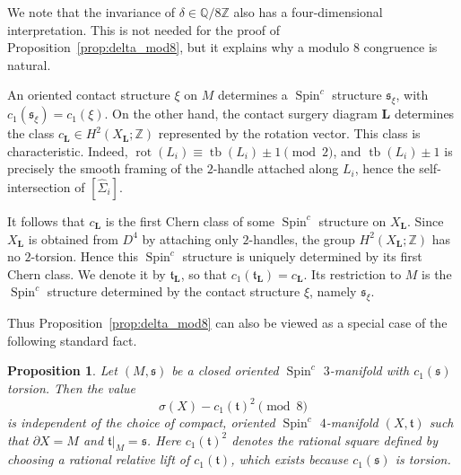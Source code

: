 \documentclass{amsart}
\numberwithin{equation}{section}
\numberwithin{figure}{section}
\newtheorem{proposition}[theorem]{Proposition}
\theoremstyle{definition}
\theoremstyle{remark}
\DeclareMathOperator{\tb}{tb}
\DeclareMathOperator{\rot}{rot}
\let\oldSigma\Sigma
\renewcommand{\Sigma}{\oldSigma}
\let\olddxi\xi %
\renewcommand{\xi}{\olddxi}
\begin{document}
We note that the invariance of \(\delta\in \mathbb Q/8\mathbb Z\) also has a four-dimensional interpretation. This is not needed for the proof of Proposition~\ref{prop:delta_mod8}, but it explains why a modulo \(8\) congruence is natural.

An oriented contact structure \(\xi\) on \(M\) determines a \(\operatorname{Spin}^c\) structure \(\mathfrak s_\xi\), with \(c_1(\mathfrak s_\xi)=c_1(\xi)\). On the other hand, the contact surgery diagram \(\boldsymbol L\) determines the class \(c_{\boldsymbol L}\in H^2(X_{\boldsymbol L};\mathbb Z)\) represented by the rotation vector. This class is characteristic. Indeed, $\rot(L_i)\equiv \tb(L_i)\pm1 \pmod 2$, and \(\tb(L_i)\pm1\) is precisely the smooth framing of the \(2\)-handle attached along \(L_i\), hence the self-intersection of \([\widehat\Sigma_i]\).

It follows that \(c_{\boldsymbol L}\) is the first Chern class of some \(\operatorname{Spin}^c\) structure on \(X_{\boldsymbol L}\). Since \(X_{\boldsymbol L}\) is obtained from \(D^4\) by attaching only \(2\)-handles, the group \(H^2(X_{\boldsymbol L};\mathbb Z)\) has no \(2\)-torsion. Hence this \(\operatorname{Spin}^c\) structure is uniquely determined by its first Chern class. We denote it by \(\mathfrak t_{\boldsymbol L}\), so that \(c_1(\mathfrak t_{\boldsymbol L})=c_{\boldsymbol L}\). Its restriction to \(M\) is the \(\operatorname{Spin}^c\) structure determined by the contact structure \(\xi\), namely \(\mathfrak s_\xi\).

Thus Proposition~\ref{prop:delta_mod8} can also be viewed as a special case of the following standard fact.

\begin{proposition}\label{lem:spinc_mod8}
Let \((M,\mathfrak s)\) be a closed oriented \(\operatorname{Spin}^c\) \(3\)-manifold with \(c_1(\mathfrak s)\) torsion. Then the value
\[
\sigma(X)-c_1(\mathfrak t)^2 \pmod 8
\]
is independent of the choice of compact, oriented \(\operatorname{Spin}^c\) \(4\)-manifold \((X,\mathfrak t)\) such that \(\partial X=M\) and \(\mathfrak t|_M=\mathfrak s\). Here \(c_1(\mathfrak t)^2\) denotes the rational square defined by choosing a rational relative lift of \(c_1(\mathfrak t)\), which exists because \(c_1(\mathfrak s)\) is torsion.
\end{proposition}
\end{document}
